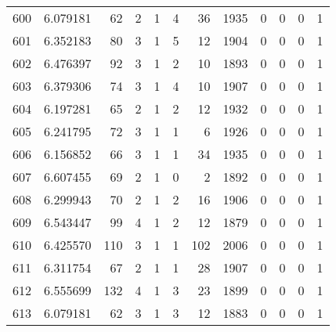 \begin{tabular}{lrrrrrrrrrrr}
600 &  6.079181 &   62 &      2 &        1 &      4 &              36 &  1935 &               0 &               0 &               0 &               1 \\
601 &  6.352183 &   80 &      3 &        1 &      5 &              12 &  1904 &               0 &               0 &               0 &               1 \\
602 &  6.476397 &   92 &      3 &        1 &      2 &              10 &  1893 &               0 &               0 &               0 &               1 \\
603 &  6.379306 &   74 &      3 &        1 &      4 &              10 &  1907 &               0 &               0 &               0 &               1 \\
604 &  6.197281 &   65 &      2 &        1 &      2 &              12 &  1932 &               0 &               0 &               0 &               1 \\
605 &  6.241795 &   72 &      3 &        1 &      1 &               6 &  1926 &               0 &               0 &               0 &               1 \\
606 &  6.156852 &   66 &      3 &        1 &      1 &              34 &  1935 &               0 &               0 &               0 &               1 \\
607 &  6.607455 &   69 &      2 &        1 &      0 &               2 &  1892 &               0 &               0 &               0 &               1 \\
608 &  6.299943 &   70 &      2 &        1 &      2 &              16 &  1906 &               0 &               0 &               0 &               1 \\
609 &  6.543447 &   99 &      4 &        1 &      2 &              12 &  1879 &               0 &               0 &               0 &               1 \\
610 &  6.425570 &  110 &      3 &        1 &      1 &             102 &  2006 &               0 &               0 &               0 &               1 \\
611 &  6.311754 &   67 &      2 &        1 &      1 &              28 &  1907 &               0 &               0 &               0 &               1 \\
612 &  6.555699 &  132 &      4 &        1 &      3 &              23 &  1899 &               0 &               0 &               0 &               1 \\
613 &  6.079181 &   62 &      3 &        1 &      3 &              12 &  1883 &               0 &               0 &               0 &               1 \\

\end{tabular}
